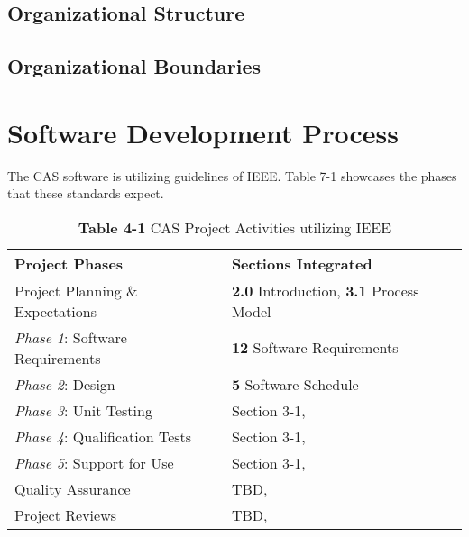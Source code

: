 \documentclass[12pt]{article}
\begin{document}
	\subsection{Organizational Structure}
	\subsection{Organizational Boundaries}
		
\section{Software Development Process}
	The CAS software is utilizing guidelines of IEEE. Table 7-1 showcases the phases that these standards expect.
		\begin{table}[!h]
			\centering
			\begin{tabularx}{\textwidth}{|l|X|}
				\hline \textbf{Project Phases} 						& \textbf{Sections Integrated} \\
				\hline Project Planning \& Expectations 			& \textbf{2.0} Introduction, \textbf{3.1} Process Model  \\
				\hline \textit{Phase 1}: Software Requirements 	& \textbf{12} Software Requirements \\
				\hline \textit{Phase 2}: Design 					& \textbf{5} Software Schedule \\
				\hline \textit{Phase 3}: Unit Testing 				& Section 3-1, \\
				\hline \textit{Phase 4}: Qualification Tests		& Section 3-1, \\
				\hline \textit{Phase 5}: Support for Use 			& Section 3-1, \\
				\hline Quality Assurance 							& TBD, \\
				\hline Project Reviews					 			& TBD, \\
		        	\hline
			\end{tabularx}
			\caption{\textbf{Table 4-1} CAS Project Activities utilizing IEEE}
		\end{table}
\end{document}
